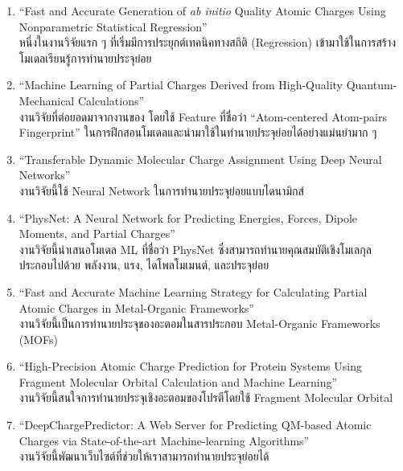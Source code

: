 \begin{enumerate}
    \item \enquote{Fast and Accurate Generation of \textit{ab initio} Quality Atomic Charges Using Nonparametric 
    Statistical Regression}\autocite{rai2013} \\ 
    หนึ่งในงานวิจัยแรก ๆ ที่เริ่มมีการประยุกต์เทคนิคทางสถิติ (Regression) เข้ามาใช้ในการสร้างโมเดลเรียนรู้การทำนายประจุย่อย
    
    \item \enquote{Machine Learning of Partial Charges Derived from High-Quality Quantum-Mechanical Calculations} 
    \autocite{bleiziffer2018} \\
    งานวิจัยที่ต่อยอดมาจากงานของ โดยใช้ Feature ที่ชื่อว่า \enquote{Atom-centered Atom-pairs Fingerprint}\autocite{carhart1985} 
    ในการฝึกสอนโมเดลและนำมาใช้ในทำนายประจุย่อยได้อย่างแม่นยำมาก ๆ
    
    \item \enquote{Transferable Dynamic Molecular Charge Assignment Using Deep Neural Networks}\autocite{nebgen2018} \\
    งานวิจัยนี้ใช้ Neural Network ในการทำนายประจุย่อยแบบไดนามิกส์
    
    \item \enquote{PhysNet: A Neural Network for Predicting Energies, Forces, Dipole Moments, and Partial Charges}
    \autocite{unke2019} \\
    งานวิจัยนี้นำเสนอโมเดล ML ที่ชื่อว่า PhysNet ซึ่งสามารถทำนายคุณสมบัติเชิงโมเลกุล ประกอบไปด้วย พลังงาน, แรง, ไดโพลโมเมนต์, 
    และประจุย่อย
    
    \item \enquote{Fast and Accurate Machine Learning Strategy for Calculating Partial Atomic Charges in 
    Metal-Organic Frameworks}\autocite{kancharlapalli2021} \\ 
    งานวิจัยนี้เป็นการทำนายประจุของอะตอมในสารประกอบ Metal-Organic Frameworks (MOFs)
    
    \item \enquote{High-Precision Atomic Charge Prediction for Protein Systems Using Fragment Molecular Orbital 
    Calculation and Machine Learning}\autocite{kato2020} \\ 
    งานวิจัยนี้สนใจการทำนายประจุเชิงอะตอมของโปรตีโดยใช้ Fragment Molecular Orbital
    
    \item \enquote{DeepChargePredictor: A Web Server for Predicting QM-based Atomic Charges via State-of-the-art 
    Machine-learning Algorithms}\autocite{wang2021} \\ 
    งานวิจัยนี้พัฒนาเว็บไซต์ที่ช่วยให้เราสามารถทำนายประจุย่อยได้
\end{enumerate}

